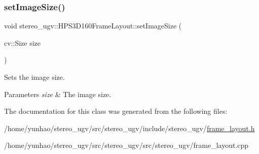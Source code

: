 \mbox{\label{classstereo__ugv_1_1HPS3D160FrameLayout_af8ec41171a86b9ed3724d9e90b756fbb}} 
\subsubsection{\texorpdfstring{set\+Image\+Size()}{setImageSize()}}
{\footnotesize\ttfamily void stereo\+\_\+ugv\+::\+H\+P\+S3\+D160\+Frame\+Layout\+::set\+Image\+Size (\begin{DoxyParamCaption}\item[{cv\+::\+Size}]{size }\end{DoxyParamCaption})}



Sets the image size. 


\begin{DoxyParams}{Parameters}
{\em size} & The image size. \\
\hline
\end{DoxyParams}


The documentation for this class was generated from the following files\+:\begin{DoxyCompactItemize}
\item 
/home/yunhao/stereo\+\_\+ugv/src/stereo\+\_\+ugv/include/stereo\+\_\+ugv/\hyperlink{frame__layout_8h}{frame\+\_\+layout.\+h}\item 
/home/yunhao/stereo\+\_\+ugv/src/stereo\+\_\+ugv/src/stereo\+\_\+ugv/frame\+\_\+layout.\+cpp\end{DoxyCompactItemize}
